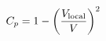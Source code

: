 \documentclass[preview]{standalone}
\begin{document}
\begin{align*}
\special{dvisvgm:raw <g id='unique000'>}C_p = 1 - \left(\frac{V_{\text{local}}}{V}\right)^2\special{dvisvgm:raw </g>}
\end{align*}
\end{document}
